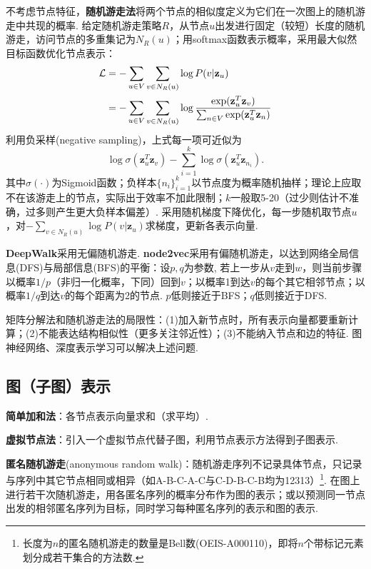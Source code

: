 \par 不考虑节点特征，\textbf{随机游走法}将两个节点的相似度定义为它们在一次图上的随机游走中共现的概率. 给定随机游走策略$R$，从节点$u$出发进行固定（较短）长度的随机游走，访问节点的多重集记为$N_R(u)$；用softmax函数表示概率，采用最大似然目标函数优化节点表示：
\begin{align}
\mathcal{L}&=-\sum_{u\in V}\sum_{v \in N_R(u)} \log P(v \vert \mathbf{z}_u)\notag \\
&=-\sum_{u\in V}\sum_{v \in N_R(u)}\log \frac{\exp(\mathbf{z}_u^T \mathbf{z}_v)}{\sum_{n\in V}\exp(\mathbf{z}_u^T \mathbf{z}_n)}
\end{align}
利用负采样(negative sampling)，上式每一项可近似为
\begin{equation}
    \log \sigma(\mathbf{z}_u^T \mathbf{z}_v)-\sum_{i=1}^k \log \sigma(\mathbf{z}_u^T \mathbf{z}_{n_i}).
\end{equation}
其中$\sigma(\cdot)$为Sigmoid函数；负样本$\{n_i\}_{i=1}^k$以节点度为概率随机抽样；理论上应取不在该游走上的节点，实际出于效率不加此限制；$k$一般取5-20（过少则估计不准确，过多则产生更大负样本偏差）. 采用随机梯度下降优化，每一步随机取节点$u$，对$-\sum_{v \in N_R(u)} \log P(v \vert \mathbf{z}_u)$求梯度，更新各表示向量. 

\par \textbf{DeepWalk}采用无偏随机游走. \textbf{node2vec}采用有偏随机游走，以达到网络全局信息(DFS)与局部信息(BFS)的平衡：设$p,q$为参数, 若上一步从$v$走到$w$，则当前步骤以概率$1/p$（非归一化概率，下同）回到$v$；以概率1到达$v$的每个其它相邻节点；以概率$1/q$到达$v$的每个距离为2的节点. $p$低则接近于BFS；$q$低则接近于DFS. 

\par 矩阵分解法和随机游走法的局限性：(1)加入新节点时，所有表示向量都要重新计算；(2)不能表达结构相似性（更多关注邻近性）；(3)不能纳入节点和边的特征. 图神经网络、深度表示学习可以解决上述问题. 

\subsection{图（子图）表示}
\par \textbf{简单加和法}：各节点表示向量求和（求平均）. 
\par \textbf{虚拟节点法}：引入一个虚拟节点代替子图，利用节点表示方法得到子图表示. 
\par \textbf{匿名随机游走}(anonymous random walk)：随机游走序列不记录具体节点，只记录与序列中其它节点相同或相异（如A-B-C-A-C与C-D-B-C-B均为12313）\footnote{长度为$n$的匿名随机游走的数量是Bell数(OEIS-A000110)，即将$n$个带标记元素划分成若干集合的方法数. }. 在图上进行若干次随机游走，用各匿名序列的概率分布作为图的表示；或以预测同一节点出发的相邻匿名序列为目标，同时学习每种匿名序列的表示和图的表示. 


